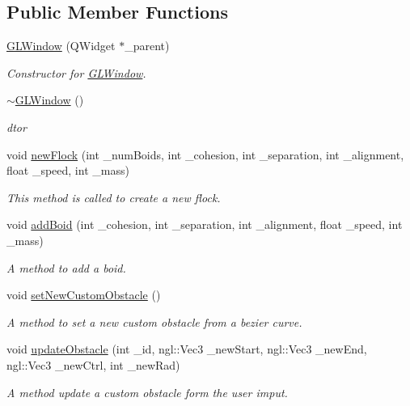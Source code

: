 \subsection*{Public Member Functions}
\begin{DoxyCompactItemize}
\item 
\hyperlink{classGLWindow_a8dfc33113be0a86a53ddbea054f75292}{GLWindow} (QWidget $\ast$\_\-parent)
\begin{DoxyCompactList}\small\item\em Constructor for \hyperlink{classGLWindow}{GLWindow}. \item\end{DoxyCompactList}\item 
\hyperlink{classGLWindow_a2eeaea2148f4f72344edd6d1bac9759b}{$\sim$GLWindow} ()
\begin{DoxyCompactList}\small\item\em dtor \item\end{DoxyCompactList}\item 
void \hyperlink{classGLWindow_aad7322148b1231ff62f918d70c1097ac}{newFlock} (int \_\-numBoids, int \_\-cohesion, int \_\-separation, int \_\-alignment, float \_\-speed, int \_\-mass)
\begin{DoxyCompactList}\small\item\em This method is called to create a new flock. \item\end{DoxyCompactList}\item 
void \hyperlink{classGLWindow_a73b0e5d5c2f1736259cf40e3eccf7036}{addBoid} (int \_\-cohesion, int \_\-separation, int \_\-alignment, float \_\-speed, int \_\-mass)
\begin{DoxyCompactList}\small\item\em A method to add a boid. \item\end{DoxyCompactList}\item 
void \hyperlink{classGLWindow_a90ba0ee1334aa3d5ed555e9c21c2861d}{setNewCustomObstacle} ()
\begin{DoxyCompactList}\small\item\em A method to set a new custom obstacle from a bezier curve. \item\end{DoxyCompactList}\item 
void \hyperlink{classGLWindow_ad611fcce0ca43aed0b6fd41df781293f}{updateObstacle} (int \_\-id, ngl::Vec3 \_\-newStart, ngl::Vec3 \_\-newEnd, ngl::Vec3 \_\-newCtrl, int \_\-newRad)
\begin{DoxyCompactList}\small\item\em A method update a custom obstacle form the user imput. \item\end{DoxyCompactList}\end{DoxyCompactItemize}
